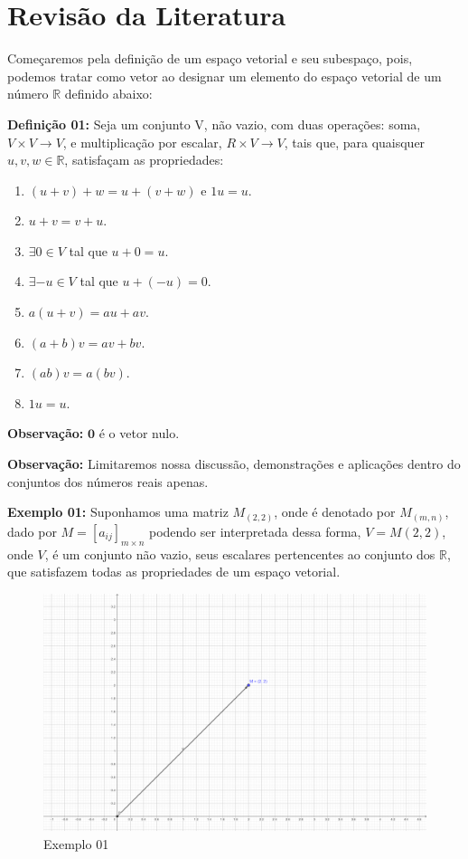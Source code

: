 \chapter{Revisão da Literatura}
Começaremos pela definição de um espaço vetorial e seu subespaço, pois, podemos tratar como vetor ao designar um elemento do espaço vetorial de um número $\mathbb{R}$ definido abaixo:

\noindent\textbf{Definição 01:} Seja um conjunto V, não vazio, com duas operações: soma, $V \times V \rightarrow V$, e multiplicação por escalar, $R \times V \rightarrow V$, tais que, para quaisquer $u, v, w \in \mathbb{R}$, satisfaçam as propriedades:
\begin{enumerate}
	\item $(u + v) + w = u + (v + w)$ e $1u = u$.
	\item $u + v = v + u$.
	\item $\exists 0 \in V$ tal que $u + 0 = u$.
	\item $\exists -u \in V$ tal que $u + (-u) = 0$.
	\item $a(u + v) = au + av$.
	\item $(a + b)v = av + bv$.
	\item $(ab)v = a(bv)$.
	\item $1u = u$.
\end{enumerate}

\noindent\textbf{Observação:} $\textbf{0}$ é o vetor nulo.

\noindent\textbf{Observação:} Limitaremos nossa discussão, demonstrações e aplicações dentro do conjuntos dos números reais apenas.

\noindent\textbf{Exemplo 01:} Suponhamos uma matriz $M_{(2, 2)}$, onde é denotado por $M_{(m,n)}$, dado por 
$M = [a_{ij}]_{m \times n}$ podendo ser interpretada dessa forma, $V = M(2, 2)$, onde $V$, é um conjunto não vazio, seus escalares pertencentes ao conjunto dos $\mathbb{R}$, que satisfazem todas as propriedades de um espaço vetorial.

\begin{figure}[H]
	\centering
	\includegraphics[scale=1.0]{exemplo01.png}
	\caption{Exemplo 01}
\end{figure}

